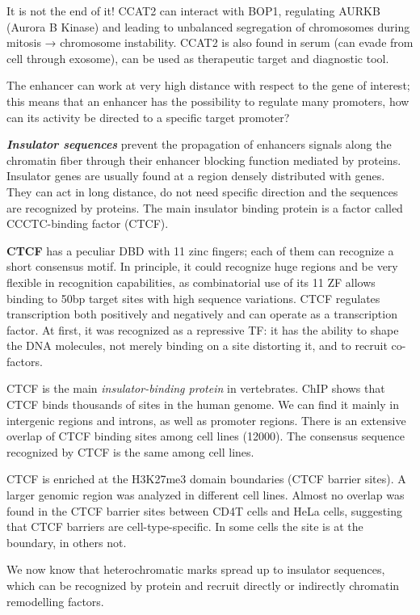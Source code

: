 It is not the end of it! CCAT2 can interact with BOP1, regulating AURKB (Aurora B Kinase) and leading to unbalanced segregation of chromosomes during mitosis → chromosome instability. CCAT2 is also found in serum (can evade from cell through exosome), can be used as therapeutic target and diagnostic tool.

The enhancer can work at very high distance with respect to the gene of interest; this means that an enhancer has the possibility to regulate many promoters, how can its activity be directed to a specific target promoter?

\textbf{\emph{Insulator sequences}} prevent the propagation of enhancers signals along the chromatin fiber through their enhancer blocking function mediated by proteins. Insulator genes are usually found at a region densely distributed with genes. They can act in long distance, do not need specific direction and the sequences are recognized by proteins. The main insulator binding protein is a factor called CCCTC-binding factor (CTCF).

\textbf{CTCF} has a peculiar DBD with 11 zinc fingers; each of them can recognize a short consensus motif. In principle, it could recognize huge regions and be very flexible in recognition capabilities, as combinatorial use of its 11 ZF allows binding to 50bp target sites with high sequence variations. CTCF regulates transcription both positively and negatively and can operate as a transcription factor. At first, it was recognized as a repressive TF: it has the ability to shape the DNA molecules, not merely binding on a site distorting it, and to recruit co-factors.

CTCF is the main \emph{insulator-binding protein} in vertebrates. ChIP shows that CTCF binds thousands of sites in the human genome. We can find it mainly in intergenic regions and introns, as well as promoter regions. There is an extensive overlap of CTCF binding sites among cell lines (12000). The consensus sequence recognized by CTCF is the same among cell lines.

CTCF is enriched at the H3K27me3 domain boundaries (CTCF barrier sites). A larger genomic region was analyzed in different cell lines. Almost no overlap was found in the CTCF barrier sites between CD4T cells and HeLa cells, suggesting that CTCF barriers are cell-type-specific. In some cells the site is at the boundary, in others not.

We now know that heterochromatic marks spread up to insulator sequences, which can be recognized by protein and recruit directly or indirectly chromatin remodelling factors.

